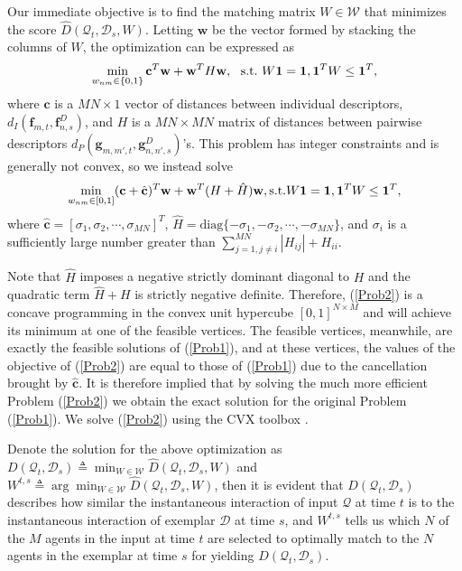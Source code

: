 Our immediate objective is to find the matching matrix $W\in\mathcal{W}$ that minimizes the score $\hat{D}(\mathcal{Q}_{t}, \mathcal{D}_{s}, W)$. Letting $\mathbf{w}$ be the vector formed by stacking the columns of $W$, the optimization can be expressed as
\begin{equation}
\label{Prob1}
\min_{w_{nm}\in\{0,1\}}\mathbf{c}^{T}\mathbf{w}+\mathbf{w}^{T}H\mathbf{w},\ \ \textup{s.t.}\ W\mathbf{1}=\mathbf{1}, \mathbf{1}^{T}W\leq\mathbf{1}^{T},
\end{equation}
where $\mathbf{c}$ is a $MN\times 1$ vector of distances between individual descriptors, $d_{I}(\mathbf{f}_{m,t}, \mathbf{f}^{D}_{n,s})$, and $H$ is a $MN\times MN$ matrix of distances between pairwise descriptors $d_{P}(\mathbf{g}_{m,m',t}, \mathbf{g}^{D}_{n,n',s})$'s. This problem has integer constraints and is generally not convex, so we instead solve
\begin{equation}
\label{Prob2}
\min_{w_{nm}\in[0,1]}(\mathbf{c}+\hat{\mathbf{c}})^{T}\mathbf{w}+\mathbf{w}^{T}(H+\hat{H})\mathbf{w}, \textup{s.t.} W\mathbf{1}=\mathbf{1}, \mathbf{1}^{T}W\leq\mathbf{1}^{T},
\end{equation}
where $\hat{\mathbf{c}}=[\sigma_{1},\sigma_{2},\cdots,\sigma_{MN}]^{T}$, $\hat{H}=\text{diag}\{-\sigma_{1},-\sigma_{2},\cdots,-\sigma_{MN}\}$, and $\sigma_{i}$ is a sufficiently large number greater than $\sum^{MN}_{j=1,j\neq i}|H_{ij}|+H_{ii}$. 

Note that $\hat{H}$ imposes a negative strictly dominant diagonal to $H$ and the quadratic term $\hat{H}+H$ is strictly negative definite. Therefore, (\ref{Prob2}) is a concave programming in the convex unit hypercube $[0,1]^{N\times M}$ and will achieve its minimum at one of the feasible vertices. The feasible vertices, meanwhile, are exactly the feasible solutions of (\ref{Prob1}), and at these vertices, the values of the objective of (\ref{Prob2}) are equal to those of (\ref{Prob1}) due to the cancellation brought by $\hat{\mathbf{c}}$. It is therefore implied that by solving the much more efficient Problem (\ref{Prob2}) we obtain the exact solution for the original Problem (\ref{Prob1}). We solve (\ref{Prob2}) using the CVX toolbox \cite{cvx}.

Denote the solution for the above optimization as $D(\mathcal{Q}_{t}, \mathcal{D}_{s})\triangleq\min_{W\in\mathcal{W}}\hat{D}(\mathcal{Q}_{t}, \mathcal{D}_{s}, W)$ and $W^{t,s}\triangleq\arg\min_{W\in\mathcal{W}}\hat{D}(\mathcal{Q}_{t}, \mathcal{D}_{s}, W)$, then it is evident that $D(\mathcal{Q}_{t}, \mathcal{D}_{s})$ describes how similar the instantaneous interaction of input $\mathcal{Q}$ at time $t$ is to the instantaneous interaction of exemplar $\mathcal{D}$ at time $s$, and $W^{t,s}$ tells us which $N$ of the $M$ agents in the input at time $t$ are selected to optimally match to the $N$ agents in the exemplar at time $s$ for yielding $D(\mathcal{Q}_{t}, \mathcal{D}_{s})$.

